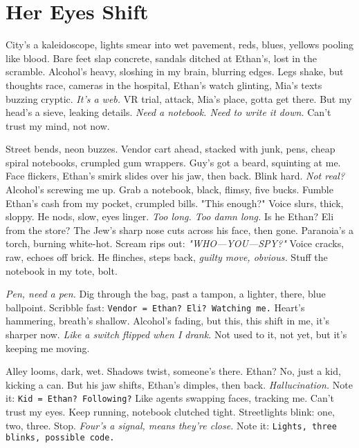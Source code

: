 \documentclass[12pt]{article}
\newcommand{\note}[1]{\texttt{#1}}
\begin{document}
{\section{Her Eyes Shift}

City’s a kaleidoscope, lights smear into wet pavement, reds, blues, yellows pooling like blood. Bare feet slap concrete, sandals ditched at \textnormal{Ethan}’s, lost in the scramble. Alcohol’s heavy, sloshing in my brain, blurring edges. Legs shake, but thoughts race, cameras in the hospital, \textnormal{Ethan}’s watch glinting, \textnormal{Mia}’s texts buzzing cryptic. \textit{It’s a web.} VR trial, attack, \textnormal{Mia}’s place, gotta get there. But my head’s a sieve, leaking details. \textit{Need a notebook. Need to write it down.} Can’t trust my mind, not now.

Street bends, neon buzzes. Vendor cart ahead, stacked with junk, pens, cheap spiral notebooks, crumpled gum wrappers. Guy’s got a beard, squinting at me. Face flickers, \textnormal{Ethan}’s smirk slides over his jaw, then back. Blink hard. \textit{Not real?} Alcohol’s screwing me up. Grab a notebook, black, flimsy, five bucks. Fumble \textnormal{Ethan}’s cash from my pocket, crumpled bills. "This enough?" Voice slurs, thick, sloppy. He nods, slow, eyes linger. \textit{Too long. Too damn long.} Is he \textnormal{Ethan}? \textnormal{Eli} from the store? The Jew’s sharp nose cuts across his face, then gone. Paranoia’s a torch, burning white-hot. Scream rips out: \textit{"WHO—YOU—SPY?"} Voice cracks, raw, echoes off brick. He flinches, steps back, \textit{guilty move, obvious.} Stuff the notebook in my tote, bolt.

\textit{Pen, need a pen.} Dig through the bag, past a tampon, a lighter, there, blue ballpoint. Scribble fast: \note{Vendor = Ethan? Eli? Watching me.} Heart’s hammering, breath’s shallow. Alcohol’s fading, but this, this shift in me, it’s sharper now. \textit{Like a switch flipped when I drank.} Not used to it, not yet, but it’s keeping me moving.

Alley looms, dark, wet. Shadows twist, someone’s there. \textnormal{Ethan}? No, just a kid, kicking a can. But his jaw shifts, \textnormal{Ethan}’s dimples, then back. \textit{Hallucination.} Note it: \note{Kid = Ethan? Following?} Like agents swapping faces, tracking me. Can’t trust my eyes. Keep running, notebook clutched tight. Streetlights blink: one, two, three. Stop. \textit{Four’s a signal, means they’re close.} Note it: \note{Lights, three blinks, possible code.}

}
\end{document}
